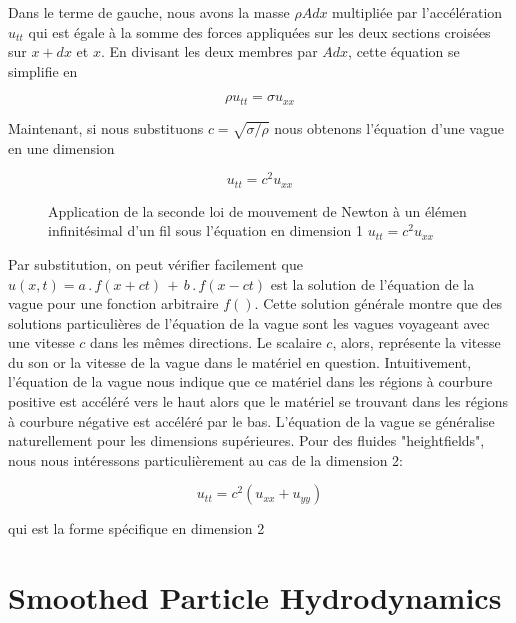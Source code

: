 \documentclass[11pt]{report}
\begin{document}
Dans le terme de gauche, nous avons la masse $\rho A dx$ multipliée par l'accélération $u_{tt}$ qui est égale à la somme des forces appliquées sur les deux sections croisées sur $x+dx$ et $x$. En divisant les deux membres par $A dx$, cette équation se simplifie en

\begin{equation}
\rho u_{tt} = \sigma u_{xx}
\end{equation}

Maintenant, si nous substituons $c = \sqrt{\sigma/\rho}$ nous obtenons l'équation d'une vague en une dimension

\begin{equation}
u_{tt} = c^2 u_{xx}
\end{equation}

\begin{figure}

\caption{Application de la seconde loi de mouvement de Newton à un élémen infinitésimal d'un fil sous l'équation en dimension 1 $u_{tt} = c^2 u_{xx}$}
\label{fig:heightfields-string}
\end{figure}

Par substitution, on peut vérifier facilement que $u(x,t) = a\,.\, f(x+ct) \,+\, b\,.\,f(x-ct)$ est la solution de l'équation de la vague pour une fonction arbitraire $f()$. Cette solution générale montre que des solutions particulières de l'équation de la vague sont les vagues voyageant avec une vitesse $c$ dans les mêmes directions. Le scalaire $c$, alors, représente la vitesse du son or la vitesse de la vague dans le matériel en question. Intuitivement, l'équation de la vague nous indique que ce matériel dans les régions à courbure positive est accéléré vers le haut alors que le matériel se trouvant dans les régions à courbure négative est accéléré par le bas. L'équation de la vague se généralise naturellement pour les dimensions supérieures. Pour des fluides "heightfields", nous nous intéressons particulièrement au cas de la dimension 2:

\begin{equation}
u_{tt} = c^2 (u_{xx} + u_{yy})
\end{equation}

qui est la forme spécifique en dimension 2

\chapter{Smoothed Particle Hydrodynamics}\label{chap:sph}
\end{document}
